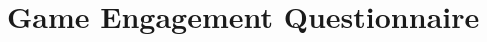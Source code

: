 \documentclass{uofsthesis-cs}
\begin{document}
\chapter{Game Engagement Questionnaire}                                   \label{app:q-geq}         \noindent{}

\end{document}
